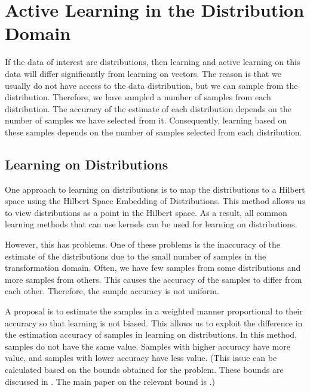 \documentclass[12pt]{article}
\begin{document}
	\section{Active Learning in the Distribution Domain}
	If the data of interest are distributions, then learning and active learning on this data will differ significantly from learning on vectors. The reason is that we usually do not have access to the data distribution, but we can sample from the distribution. Therefore, we have sampled a number of samples from each distribution. The accuracy of the estimate of each distribution depends on the number of samples we have selected from it. Consequently, learning based on these samples depends on the number of samples selected from each distribution.
	
	\subsection{Learning on Distributions}
	One approach to learning on distributions is to map the distributions to a Hilbert space using the Hilbert Space Embedding of Distributions. This method allows us to view distributions as a point in the Hilbert space. As a result, all common learning methods that can use kernels can be used for learning on distributions.
	
	However, this has problems. One of these problems is the inaccuracy of the estimate of the distributions due to the small number of samples in the transformation domain. Often, we have few samples from some distributions and more samples from others. This causes the accuracy of the samples to differ from each other. Therefore, the sample accuracy is not uniform.
	
	A proposal is to estimate the samples in a weighted manner proportional to their accuracy so that learning is not biased. This allows us to exploit the difference in the estimation accuracy of samples in learning on distributions. In this method, samples do not have the same value. Samples with higher accuracy have more value, and samples with lower accuracy have less value. (This issue can be calculated based on the bounds obtained for the problem. These bounds are discussed in \cite{muandet2012domain}. The main paper on the relevant bound is \cite{muandet2012domain}.)
	
\end{document}
